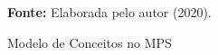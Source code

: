 \begin{figure}[ht!]
\centering

\caption{\textmd{Modelo de Conceitos no \gls{MPS}}}
\label{fig:classesmps}

\par\medskip\textbf{Fonte:} Elaborada pelo autor (2020). \par\medskip

\end{figure}

